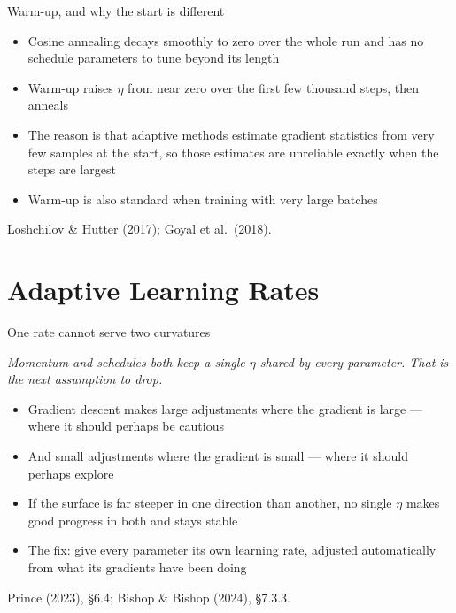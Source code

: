 \documentclass[aspectratio=169, 11pt]{beamer}
\newcommand{\bridge}[1]{%
  {\scriptsize\itshape\color{mcMuted} #1\par}\vspace{0.35em}}
\newcommand{\srcline}[1]{%
  \par\vspace{0.25em}%
  {\scriptsize\color{mcMuted}\hfill #1\par}}
\begin{document}
\begin{frame}{Warm-up, and why the start is different}
  \vspace{0.3em}
  \begin{itemize}\itemsep0.45em
    \item Cosine annealing decays smoothly to zero over the whole run
          and has no schedule parameters to tune beyond its length
    \item \alert{Warm-up} raises $\eta$ from near zero over the first
          few thousand steps, then anneals
    \item The reason is that adaptive methods estimate gradient
          statistics from very few samples at the start, so those
          estimates are unreliable exactly when the steps are largest
    \item Warm-up is also standard when training with very large batches
  \end{itemize}
  \srcline{Loshchilov \& Hutter (2017); Goyal et al.~(2018).}
\end{frame}

\section{Adaptive Learning Rates}

\begin{frame}{One rate cannot serve two curvatures}
  \bridge{Momentum and schedules both keep a single $\eta$ shared by
  every parameter. That is the next assumption to drop.}
  \vspace{0.4em}
  \begin{itemize}\itemsep0.45em
    \item Gradient descent makes \alert{large} adjustments where the
          gradient is large --- where it should perhaps be cautious
    \item And \alert{small} adjustments where the gradient is small ---
          where it should perhaps explore
    \item If the surface is far steeper in one direction than another,
          no single $\eta$ makes good progress in both and stays stable
    \item The fix: give every parameter its own learning rate, adjusted
          automatically from what its gradients have been doing
  \end{itemize}
  \srcline{Prince (2023), \S6.4; Bishop \& Bishop (2024), \S7.3.3.}
\end{frame}
\end{document}
